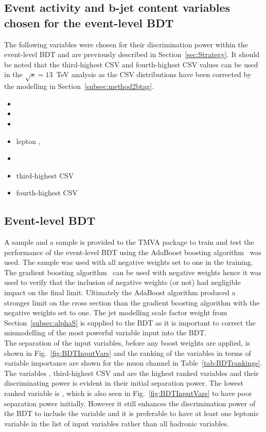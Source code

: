 \subsection{Event activity and b-jet content variables chosen for the event-level BDT}
The following variables were chosen for their discrimination power within the event-level BDT and are previously described in Section~\ref{sec:Strategy}. It should be noted that the third-highest CSV and fourth-highest CSV values can be used in the $\sqrt{s} = 13$~TeV analysis as the CSV distributions have been corrected by the modelling in Section~\ref{subsec:method2btag}.


\begin{multicols}{2}
\setlength{\columnseprule}{0pt} 

\begin{itemize}
\item \htb
\item \htrat
\item \njets
\item lepton \pt, \leadleppt
\item \njetsw
\item third-highest CSV
\item fourth-highest CSV
\end{itemize}

\end{multicols}

\subsection{Event-level BDT}
A \ttbar sample and a \tttt sample is provided to the TMVA package to train and test the performance of the event-level BDT using the AdaBoost boosting algorithm~\cite{FREUND1997119} was used. The \MADGRAPH\aMCATNLO \tttt sample was used with all negative weights set to one in the training. The gradient boosting algorithm~\cite{mason1999boosting} can be used with negative weights hence it was used to verify that the inclusion of negative weights (or not) had negligible impact on the final limit. Ultimately the AdaBoost algorithm produced a stronger limit on the \tttt cross section than the gradient boosting algorithm with the negative weights set to one. The jet modelling scale factor weight from Section~\ref{subsec:alphaS} is supplied to the BDT as it is important to correct the mismodelling of the most powerful variable input into the BDT.\\
The separation of the input variables, before any boost weights are applied, is shown in Fig.~\ref{fig:BDTInputVars} and the ranking of the variables in terms of variable importance are shown for the muon channel in Table~\ref{tab:BDTrankings}. The variables \njets, third-highest CSV and \htrat are the highest ranked variables and their discriminating power is evident in their initial separation power. The lowest ranked variable is \leadleppt, which is also seen in Fig.~\ref{fig:BDTInputVars} to have poor separation power initially. However it still enhances the discrimination power of the BDT to include the \leadleppt variable and it is preferable to have at least one leptonic variable in the list of input variables rather than all hadronic variables.

